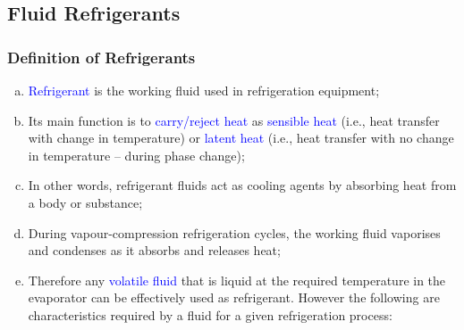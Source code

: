 \documentclass[10pt,compress]{beamer}
\begin{document}
\subsection{Fluid Refrigerants}
\begin{frame}
 \frametitle{Definition of Refrigerants}
  \begin{enumerate}[(a)]
   \item <1-> \textcolor{blue}{Refrigerant} is the working fluid used in refrigeration equipment; 
   \item <2-> Its main function is to \textcolor{blue}{carry/reject heat} as \textcolor{blue}{sensible heat} (i.e., heat transfer with change in temperature) or \textcolor{blue}{latent heat} (i.e., heat transfer with no change in temperature -- during phase change);
   \item <3-> In other words, refrigerant fluids act as cooling agents by absorbing heat from a body or substance;
   \item <4-> During vapour-compression refrigeration cycles, the working fluid vaporises and condenses as it absorbs and releases heat;
   \item <5-> Therefore any \textcolor{blue}{volatile fluid} that is liquid at the required temperature in the evaporator can be effectively used as refrigerant. However the following are characteristics required by a fluid for a given refrigeration process:
  \end{enumerate}
\end{frame}
\end{document}
